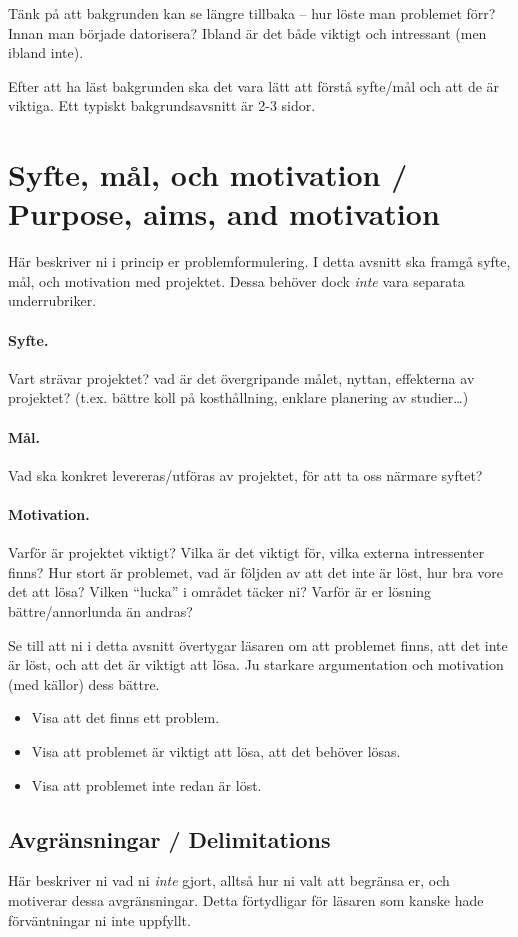 \documentclass[a4paper,12pt]{article}
\begin{document}
Tänk på att bakgrunden kan se längre tillbaka -- hur löste man problemet förr? Innan man började datorisera? Ibland är det både viktigt och intressant (men ibland inte).

Efter att ha läst bakgrunden ska det vara lätt att förstå syfte/mål och att de är viktiga. Ett typiskt bakgrundsavsnitt är 2-3 sidor.

\section{Syfte, mål, och motivation / Purpose, aims, and motivation}\label{sec:syfte}
Här beskriver ni i princip er problemformulering.  I detta avsnitt ska framgå syfte, mål, och motivation med projektet. 
Dessa behöver dock \emph{inte} vara separata underrubriker.

\paragraph{Syfte.} Vart strävar projektet? vad är det övergripande målet, nyttan, effekterna av projektet?  (t.ex. bättre koll på kosthållning, enklare planering av studier\ldots)
\paragraph{Mål.} Vad ska konkret levereras/utföras av projektet, för att ta oss närmare syftet?
\paragraph{Motivation.}  Varför är projektet viktigt?  Vilka är det viktigt för, vilka externa intressenter finns?  Hur stort är problemet, vad är följden av att det inte är löst, hur bra vore det att lösa?  Vilken ``lucka'' i området täcker ni?
Varför är er lösning bättre/annorlunda än andras?

Se till att ni i detta avsnitt övertygar läsaren om att problemet finns, att det inte är löst, och att det är viktigt att lösa. Ju starkare argumentation och motivation (med källor) dess bättre.
\begin{itemize}
\item Visa att det finns ett problem.
\item Visa att problemet är viktigt att lösa, att det behöver lösas.
\item Visa att problemet inte redan är löst.
\end{itemize}

\subsection{Avgränsningar / Delimitations}
Här beskriver ni vad ni \emph{inte} gjort, alltså hur ni valt att begränsa er, och motiverar dessa avgränsningar. Detta förtydligar för läsaren som kanske hade förväntningar ni inte uppfyllt.
\end{document}
